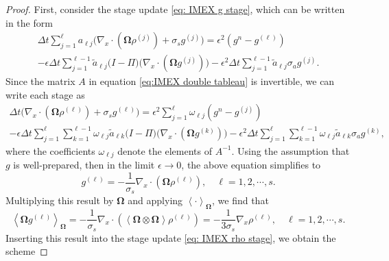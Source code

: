 \documentclass[onefignum,onetabnum]{siamart220329}
\begin{document}
\begin{proof}
    First, consider the stage update \eqref{eq: IMEX g stage}, which can be written in the form
    \begin{multline*}
        \Delta t \sum_{j=1}^{\ell} a_{\ell j} \Bigg( \nabla_{x} \cdot \left( \mathbf{\Omega} \rho^{(j)} \right) + \sigma_{s} g^{(j)} \Bigg) = \epsilon^{2}\left( g^{n} - g^{(\ell)} \right) \\ - \epsilon \Delta t \sum_{j=1}^{\ell-1} \widetilde{a}_{\ell j} \Big( I - \Pi \Big) \Big( \nabla_{x} \cdot \left(  \mathbf{\Omega} g^{(j)} \right) \Big) - \epsilon^{2}\Delta t \sum_{j=1}^{\ell-1} \widetilde{a}_{\ell j} \sigma_{a} g^{(j)}.
    \end{multline*}
    Since the matrix $A$ in equation \eqref{eq:IMEX double tableau} is invertible, we can write each stage as
    \begin{multline*}
        \Delta t \Bigg( \nabla_{x} \cdot \left( \mathbf{\Omega} \rho^{(\ell)} \right) + \sigma_{s} g^{(\ell)} \Bigg) = \epsilon^{2}\sum_{j=1}^{\ell}\omega_{\ell j}\left( g^{n} - g^{(j)} \right) \\ - \epsilon \Delta t \sum_{j=1}^{\ell} \sum_{k=1}^{\ell-1} \omega_{\ell j}\widetilde{a}_{\ell k} \Big( I - \Pi \Big) \Big( \nabla_{x} \cdot \left(  \mathbf{\Omega} g^{(k)} \right) \Big) - \epsilon^{2}\Delta t \sum_{j=1}^{\ell} \sum_{k=1}^{\ell-1} \omega_{\ell j} \widetilde{a}_{\ell k} \sigma_{a} g^{(k)},
    \end{multline*}
    where the coefficients $\omega_{\ell j}$ denote the elements of $A^{-1}$. Using the assumption that $g$ is well-prepared, then in the limit $\epsilon \rightarrow 0$, the above equation simplifies to
    \begin{equation*}
        g^{(\ell)} = -\frac{1}{\sigma_{s}}\nabla_{x} \cdot \left( \mathbf{\Omega} \rho^{(\ell)} \right), \quad \ell = 1,2, \cdots, s. 
    \end{equation*}
    Multiplying this result by $\mathbf{\Omega}$ and applying $\left\langle \cdot \right\rangle_{\mathbf{\Omega}}$, we find that
    \begin{equation}
        \left\langle \mathbf{\Omega} g^{(\ell)} \right\rangle_{\mathbf{\Omega}} = -\frac{1}{\sigma_{s}} \nabla_{x} \cdot \left( \left\langle \mathbf{\Omega} \otimes \mathbf{\Omega} \right\rangle \rho^{(\ell)} \right) = -\frac{1}{3\sigma_{s}} \nabla_{x}  \rho^{(\ell)}, \quad \ell = 1,2,\cdots,s. \label{eq:limiting moment of g at stages}
    \end{equation}
    Inserting this result into the stage update \eqref{eq: IMEX rho stage}, we obtain the scheme

\end{proof}
\end{document}
